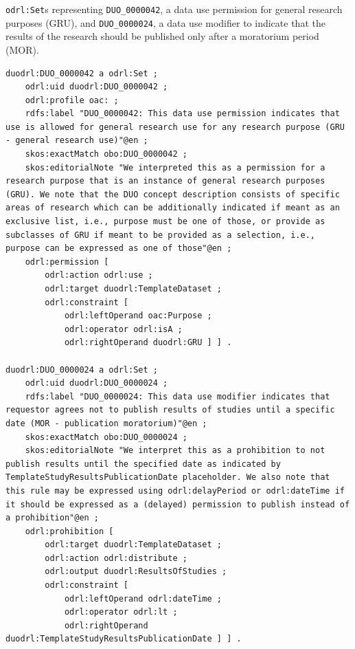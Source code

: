 \begin{listing}[htp]
\caption{\texttt{odrl:Set}s representing \texttt{DUO\_0000042}, a data use permission for general research purposes (GRU), and \texttt{DUO\_0000024}, a data use modifier to indicate that the results of the research should be published only after a moratorium period (MOR).}
\label{list:duodrl_set}
\begin{verbatim}
duodrl:DUO_0000042 a odrl:Set ;
    odrl:uid duodrl:DUO_0000042 ;
    odrl:profile oac: ;
    rdfs:label "DUO_0000042: This data use permission indicates that use is allowed for general research use for any research purpose (GRU - general research use)"@en ;
    skos:exactMatch obo:DUO_0000042 ;
    skos:editorialNote "We interpreted this as a permission for a research purpose that is an instance of general research purposes (GRU). We note that the DUO concept description consists of specific areas of research which can be additionally indicated if meant as an exclusive list, i.e., purpose must be one of those, or provide as subclasses of GRU if meant to be provided as a selection, i.e., purpose can be expressed as one of those"@en ;
    odrl:permission [
        odrl:action odrl:use ;
        odrl:target duodrl:TemplateDataset ;
        odrl:constraint [
            odrl:leftOperand oac:Purpose ;
            odrl:operator odrl:isA ;
            odrl:rightOperand duodrl:GRU ] ] .
    
duodrl:DUO_0000024 a odrl:Set ;
    odrl:uid duodrl:DUO_0000024 ;
    rdfs:label "DUO_0000024: This data use modifier indicates that requestor agrees not to publish results of studies until a specific date (MOR - publication moratorium)"@en ;
    skos:exactMatch obo:DUO_0000024 ;
    skos:editorialNote "We interpret this as a prohibition to not publish results until the specified date as indicated by TemplateStudyResultsPublicationDate placeholder. We also note that this rule may be expressed using odrl:delayPeriod or odrl:dateTime if it should be expressed as a (delayed) permission to publish instead of a prohibition"@en ;
    odrl:prohibition [
        odrl:target duodrl:TemplateDataset ;
        odrl:action odrl:distribute ;
        odrl:output duodrl:ResultsOfStudies ;
        odrl:constraint [
            odrl:leftOperand odrl:dateTime ;
            odrl:operator odrl:lt ;
            odrl:rightOperand duodrl:TemplateStudyResultsPublicationDate ] ] .
\end{verbatim}
\end{listing}

